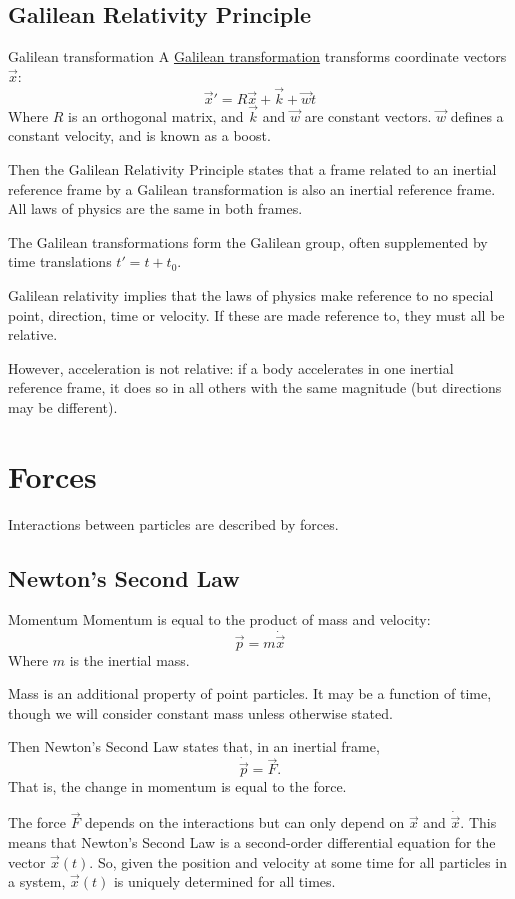 \documentclass[../Main.tex]{subfiles}
\begin{document}
\subsection{Galilean Relativity Principle}
\begin{definition}{Galilean transformation}
    A \underline{Galilean transformation} transforms coordinate vectors $\vec{x}$:
    \begin{equation}
        \vec{x}' = R\vec{x} + \vec{k} + \vec{w}t
        \label{eqnGalileanTransform}
    \end{equation}
    Where $R$ is an orthogonal matrix, and $\vec{k}$ and $\vec{w}$ are constant vectors. $\vec{w}$ defines a constant velocity, and is known as a boost.
\end{definition}
Then the Galilean Relativity Principle states that a frame related to an inertial reference frame by a Galilean transformation is also an inertial reference frame. All laws of physics are the same in both frames.\par
The Galilean transformations form the Galilean group, often supplemented by time translations $t' = t + t_0$.\par
Galilean relativity implies that the laws of physics make reference to no special point, direction, time or velocity. If these are made reference to, they must all be relative.\par
However, acceleration is not relative: if a body accelerates in one inertial reference frame, it does so in all others with the same magnitude (but directions may be different).
\section{Forces}
Interactions between particles are described by forces.
\subsection{Newton's Second Law}
\begin{definition}{Momentum}
    Momentum is equal to the product of mass and velocity:
    \begin{equation*}
        \vec{p} = m \dot{\vec{x}}
    \end{equation*}
    Where $m$ is the inertial mass.
\end{definition}
Mass is an additional property of point particles. It may be a function of time, though we will consider constant mass unless otherwise stated.\par
Then Newton's Second Law states that, in an inertial frame,
\begin{equation}
    \dot{\vec{p}} = \vec{F}.
    \label{eqnNewtonII}
\end{equation}
That is, the change in momentum is equal to the force.\par
The force $\vec{F}$ depends on the interactions but can only depend on $\vec{x}$ and $\dot{\vec{x}}$. This means that Newton's Second Law is a second-order differential equation for the vector $\vec{x}(t)$. So, given the position and velocity at some time for all particles in a system, $\vec{x}(t)$ is uniquely determined for all times.
\end{document}
